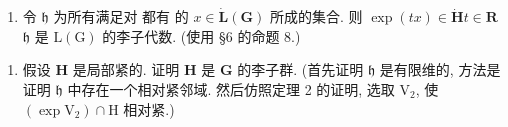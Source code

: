\begin{enumerate}
\def\labelenumi{(\alph{enumi})}
\tightlist
\item
  令 \(\mathfrak{h}\) 为所有满足对  都有  的 \(x\in \dot{\mathbf{L}} (\mathbf{G})\) 所成的集合. 则 \(\exp (tx)\in \dot{\mathbf{H}}\)\(t\in \mathbf{R}\)\(\mathfrak{h}\) 是 \(\mathrm{L}(\mathrm{G})\) 的李子代数. (使用 §6 的命题 8.)
\end{enumerate}

\begin{enumerate}
\def\labelenumi{(\alph{enumi})}
\setcounter{enumi}{1}
\tightlist
\item
  假设 \(\mathbf{H}\) 是局部紧的. 证明 \(\mathbf{H}\) 是 \(\mathbf{G}\) 的李子群. (首先证明 \(\mathfrak{h}\) 是有限维的, 方法是证明 \(\mathfrak{h}\) 中存在一个相对紧邻域. 然后仿照定理 2 的证明, 选取 \(\mathrm{V}_2\), 使 \((\exp \mathrm{V}_2) \cap \mathrm{H}\) 相对紧.)
\end{enumerate}

